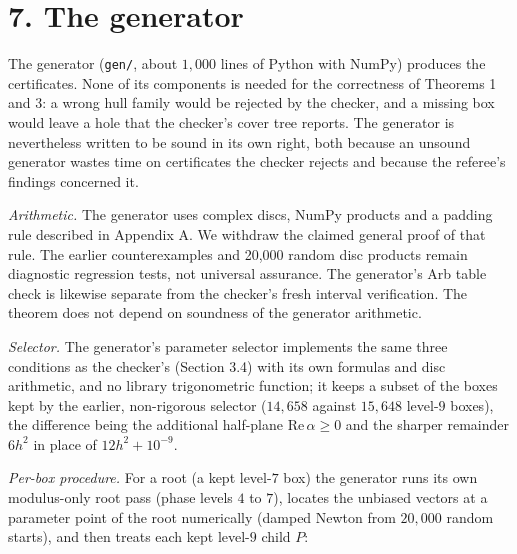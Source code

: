 \documentclass[
  11pt,
]{article}
\begin{document}
\section{7. The generator}\label{the-generator}

The generator (\texttt{gen/}, about \(1{,}000\) lines of Python with
NumPy) produces the certificates. None of its components is needed for
the correctness of Theorems 1 and 3: a wrong hull family would be
rejected by the checker, and a missing box would leave a hole that the
checker's cover tree reports. The generator is nevertheless written to
be sound in its own right, both because an unsound generator wastes time
on certificates the checker rejects and because the referee's findings
concerned it.

\emph{Arithmetic.} The generator uses complex discs, NumPy products and
a padding rule described in Appendix A. We withdraw the claimed general
proof of that rule. The earlier counterexamples and 20,000 random disc
products remain diagnostic regression tests, not universal assurance.
The generator's Arb table check is likewise separate from the checker's
fresh interval verification. The theorem does not depend on soundness of
the generator arithmetic.

\emph{Selector.} The generator's parameter selector implements the same
three conditions as the checker's (Section 3.4) with its own formulas
and disc arithmetic, and no library trigonometric function; it keeps a
subset of the boxes kept by the earlier, non-rigorous selector
(\(14{,}658\) against \(15{,}648\) level-\(9\) boxes), the difference
being the additional half-plane \(\mathrm{Re}\,\alpha\ge0\) and the
sharper remainder \(6h^2\) in place of \(12h^2+10^{-9}\).

\emph{Per-box procedure.} For a root (a kept level-\(7\) box) the
generator runs its own modulus-only root pass (phase levels \(4\) to
\(7\)), locates the unbiased vectors at a parameter point of the root
numerically (damped Newton from \(20{,}000\) random starts), and then
treats each kept level-\(9\) child \(P\):
\end{document}
